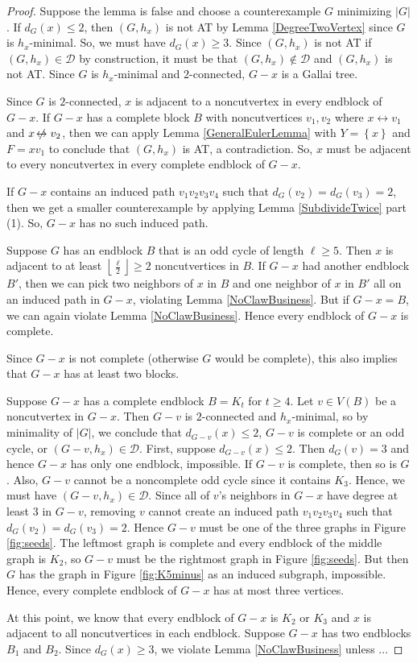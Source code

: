 \documentclass[12pt]{article}
\theoremstyle{plain}
\theoremstyle{definition}
\theoremstyle{remark}
\newcommand{\fancy}[1]{\mathcal{#1}}
\newcommand{\D}{\fancy{D}}
\newcommand{\set}[1]{\left\{ #1 \right\}}
\newcommand{\card}[1]{\left|#1\right|}
\newcommand{\floor}[1]{\left\lfloor#1\right\rfloor}
\def\adj{\leftrightarrow}
\def\nonadj{\not\!\leftrightarrow}
\def\D{\fancy{D}}
\def\adj{\leftrightarrow}
\begin{document}
\begin{proof}
	Suppose the lemma is false and choose a counterexample $G$ minimizing $\card{G}$.  If $d_G(x) \le 2$, then $(G,h_x)$ is not AT by Lemma \ref{DegreeTwoVertex} since $G$ is $h_x$-minimal.  So, we must have $d_G(x) \ge 3$.  Since $(G,h_x)$ is not AT if $(G,h_x) \in \D$ by construction, it must be that $(G,h_x) \not \in \D$ and $(G,h_x)$ is not AT.  Since $G$ is $h_x$-minimal and $2$-connected, $G-x$ is a Gallai tree.  
	
	 Since $G$ is $2$-connected, $x$ is adjacent to a noncutvertex in every endblock of $G-x$.  If $G-x$ has a complete block $B$ with noncutvertices $v_1,v_2$ where $x \adj v_1$ and $x \nonadj v_2$, then we can apply Lemma \ref{GeneralEulerLemma} with $Y = \set{x}$ and $F = xv_1$ to conclude that $(G,h_x)$ is AT, a contradiction.  So, $x$ must be adjacent to every noncutvertex in every complete endblock of $G-x$.
	 
	 If $G-x$ contains an induced path $v_1v_2v_3v_4$ such that $d_G(v_2) = d_G(v_3) = 2$, then we get a smaller counterexample by applying Lemma \ref{SubdivideTwice} part (1).  So, $G-x$ has no such induced path.  
	 
	 Suppose $G$ has an endblock $B$ that is an odd cycle of length $\ell \ge 5$. Then $x$ is adjacent to at least $\floor{\frac{\ell}{2}} \ge 2$ noncutvertices in $B$.  If $G-x$ had another endblock $B'$, then we can pick two neighbors of $x$ in $B$ and one neighbor of $x$ in $B'$ all on an induced path in $G-x$, violating Lemma \ref{NoClawBusiness}.  But if $G-x = B$, we can again violate Lemma \ref{NoClawBusiness}.  Hence every endblock of $G-x$ is complete.  
	 
	 Since $G-x$ is not complete (otherwise $G$ would be complete), this also implies that $G-x$ has at least two blocks.

	 Suppose $G-x$ has a complete endblock $B = K_t$ for $t \ge 4$.  Let $v \in V(B)$ be a noncutvertex in $G-x$.  Then $G-v$ is $2$-connected and $h_x$-minimal, so by minimality of $\card{G}$, we conclude that $d_{G-v}(x) \le 2$, $G-v$ is complete or an odd cycle, or $(G-v,h_x) \in \D$.  First, suppose $d_{G-v}(x) \le 2$.  Then $d_G(v) = 3$ and hence $G-x$ has only one endblock, impossible.  If $G-v$ is complete, then so is $G$.  Also, $G-v$ cannot be a noncomplete odd cycle since it contains $K_3$.  Hence, we must have $(G-v,h_x) \in \D$.  Since all of $v$'s neighbors in $G-x$ have degree at least $3$ in $G-v$, removing $v$ cannot create an induced path $v_1v_2v_3v_4$ such that $d_G(v_2) = d_G(v_3) = 2$.  Hence $G-v$ must be one of the three graphs in Figure \ref{fig:seeds}.  The leftmost graph is complete and every endblock of the middle graph is $K_2$, so $G-v$ must be the rightmost graph in Figure \ref{fig:seeds}.  But then $G$ has the graph in Figure \ref{fig:K5minus} as an induced subgraph, impossible.  Hence, every complete endblock of $G-x$ has at most three vertices.
	 
	 At this point, we know that every endblock of $G-x$ is $K_2$ or $K_3$ and $x$ is adjacent to all noncutvertices in each endblock.  Suppose $G-x$ has two endblocks $B_1$ and $B_2$.  Since $d_G(x) \ge 3$, we violate Lemma \ref{NoClawBusiness} unless ...
\end{proof}



\end{document}
